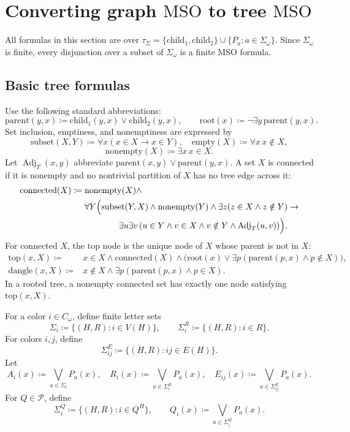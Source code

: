 \documentclass[11pt]{article}
\theoremstyle{definition}
\newcommand{\MSO}{\ensuremath{\mathrm{MSO}}}
\newcommand{\defeq}{\coloneqq}
\newcommand{\topnode}{\mathrm{top}}
\newcommand{\child}{\mathrm{child}}
\newcommand{\parent}{\mathrm{parent}}
\newcommand{\rootnode}{\mathrm{root}}
\newcommand{\Pred}{\mathcal P}
\newcommand{\emptysetf}{\mathrm{empty}}
\newcommand{\subsetf}{\mathrm{subset}}
\newcommand{\nonempty}{\mathrm{nonempty}}
\newcommand{\conn}{\mathrm{connected}}
\newcommand{\dang}{\mathrm{dangle}}
\begin{document}
\section{Converting graph \texorpdfstring{\(\MSO\)}{MSO} to tree \texorpdfstring{\(\MSO\)}{MSO}}

All formulas in this section are over
\(\tau_\Sigma=\{\child_1,\child_2\}\cup\{P_a:a\in\Sigma_\omega\}\).  Since
\(\Sigma_\omega\) is finite, every disjunction over a subset of \(\Sigma_\omega\)
is a finite \MSO{} formula.

\subsection{Basic tree formulas}

Use the following standard abbreviations:
\[
  \parent(y,x) \defeq \child_1(y,x)\vee\child_2(y,x),
  \qquad
  \rootnode(x) \defeq \neg\exists y\,\parent(y,x).
\]
Set inclusion, emptiness, and nonemptiness are expressed by
\[
  \subsetf(X,Y)\defeq \forall x(x\in X\to x\in Y),\quad
  \emptysetf(X)\defeq \forall x\,x\notin X,
\]
\[
  \nonempty(X)\defeq \exists x\,x\in X.
\]
Let \(\operatorname{Adj}_T(x,y)\) abbreviate
\(\parent(x,y)\vee\parent(y,x)\).  A set \(X\) is connected if it is nonempty and
no nontrivial partition of \(X\) has no tree edge across it:
\[
\begin{aligned}
  \conn(X) \defeq{}& \nonempty(X)\wedge \\
  &\forall Y\Bigl(
    \subsetf(Y,X)\wedge\nonempty(Y)\wedge\exists z(z\in X\wedge z\notin Y)
    \to \\
  &\qquad\qquad \exists u\exists v\,
    (u\in Y\wedge v\in X\wedge v\notin Y\wedge \operatorname{Adj}_T(u,v))
  \Bigr).
\end{aligned}
\]
For connected \(X\), the top node is the unique node of \(X\) whose parent is not
in \(X\):
\[
\begin{aligned}
  \topnode(x,X) \defeq{}& x\in X\wedge \conn(X)\wedge
  \bigl(\rootnode(x)\vee \exists p(\parent(p,x)\wedge p\notin X)\bigr),\\
  \dang(x,X) \defeq{}& x\notin X\wedge \exists p(\parent(p,x)\wedge p\in X).
\end{aligned}
\]
In a rooted tree, a nonempty connected set has exactly one node satisfying
\(\topnode(x,X)\).

For a color \(i\in C_\omega\), define finite letter sets
\[
  \Sigma_i\defeq\{(H,R):i\in V(H)\},\qquad
  \Sigma_i^R\defeq\{(H,R):i\in R\}.
\]
For colors \(i,j\), define
\[
  \Sigma_{ij}^E\defeq\{(H,R): ij\in E(H)\}.
\]
Let
\[
  A_i(x)\defeq \bigvee_{a\in\Sigma_i} P_a(x),\quad
  R_i(x)\defeq \bigvee_{a\in\Sigma_i^R} P_a(x),\quad
  E_{ij}(x)\defeq \bigvee_{a\in\Sigma_{ij}^E} P_a(x).
\]
For \(Q\in\Pred\), define
\[
  \Sigma_i^Q\defeq\{(H,R): i\in Q^H\},
  \qquad
  Q_i(x)\defeq\bigvee_{a\in\Sigma_i^Q}P_a(x).
\]
\end{document}
